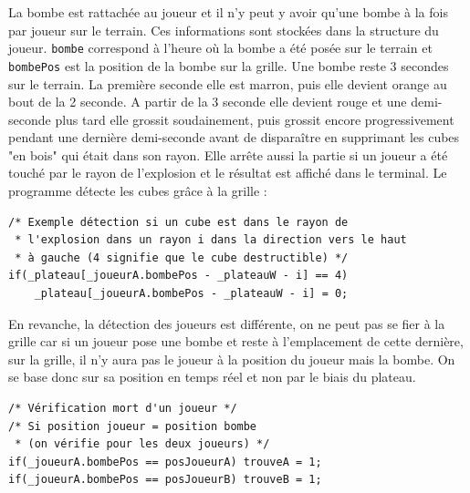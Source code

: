 \documentclass{article}
\begin{document}
    La bombe est rattachée au joueur et il n'y peut y avoir qu'une bombe à la fois par joueur sur le terrain. Ces informations sont stockées dans la structure du joueur. \texttt{bombe} correspond à l'heure où la bombe a été posée sur le terrain et \texttt{bombePos} est la position de la bombe sur la grille.
    Une bombe reste 3 secondes sur le terrain. La première seconde elle est marron, puis elle devient orange au bout de la 2 seconde. A partir de la 3 seconde elle devient rouge et une demi-seconde plus tard elle grossit soudainement, puis grossit encore progressivement pendant une dernière demi-seconde avant de disparaître en supprimant les cubes "en bois" qui était dans son rayon. Elle arrête aussi la partie si un joueur a été touché par le rayon de l'explosion et le résultat est affiché dans le terminal.
    Le programme détecte les cubes grâce à la grille :
    \begin{center}\begin{minipage}{0.9\textwidth}
        \begin{verbatim}
/* Exemple détection si un cube est dans le rayon de
 * l'explosion dans un rayon i dans la direction vers le haut
 * à gauche (4 signifie que le cube destructible) */
if(_plateau[_joueurA.bombePos - _plateauW - i] == 4)
    _plateau[_joueurA.bombePos - _plateauW - i] = 0;
        \end{verbatim}
    \end{minipage}\end{center}

    En revanche, la détection des joueurs est différente, on ne peut pas se fier à la grille car si un joueur pose une bombe et reste à l'emplacement de cette dernière, sur la grille, il n'y aura pas le joueur à la position du joueur mais la bombe. On se base donc sur sa position en temps réel et non par le biais du plateau.
    \begin{center}\begin{minipage}{0.9\textwidth}
        \begin{verbatim}
/* Vérification mort d'un joueur */
/* Si position joueur = position bombe
 * (on vérifie pour les deux joueurs) */
if(_joueurA.bombePos == posJoueurA) trouveA = 1;
if(_joueurA.bombePos == posJoueurB) trouveB = 1;
        \end{verbatim}
    \end{minipage}\end{center}
    \vspace{10pt}
\end{document}
